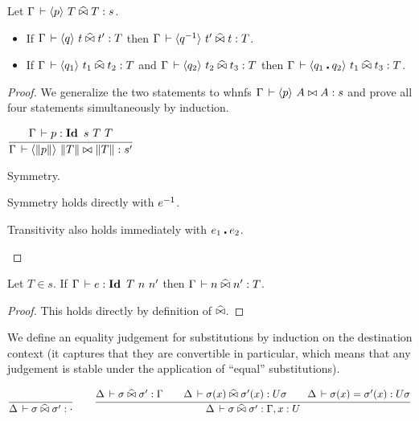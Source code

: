 \documentclass[a4paper,english]{lipics-utf8x}
\begin{document}
  \begin{lemma}
    \label{lem:s-per}
    Let $\Gamma \,\vdash \langle p \rangle~ T \mathrel{\widehat{\bowtie}} T : s$.
    \leavevmode
    \begin{itemize}
      \item If $\Gamma \,\vdash \langle q \rangle~ t \mathrel{\widehat{\bowtie}} t' : T$ then
      $\Gamma \,\vdash \langle q^{-1} \rangle~ t' \mathrel{\widehat{\bowtie}} t : T$.
      \item If $\Gamma \,\vdash \langle q_1 \rangle~ t_1 \mathrel{\widehat{\bowtie}} t_2 : T$ and
      $\Gamma \,\vdash \langle q_2 \rangle~ t_2 \mathrel{\widehat{\bowtie}} t_3 : T$
      then $\Gamma \,\vdash \langle q_1 \centerdot q_2 \rangle~ t_1 \mathrel{\widehat{\bowtie}} t_3 : T$.
    \end{itemize}
  \end{lemma}

  \begin{proof}
    We generalize the two statements to whnfs
    $\Gamma \,\vdash \langle p \rangle~ A \mathrel{\bowtie} A : s$ and
    prove all four statements simultaneously by induction.

    \begin{center}
    \(
      \ru{\Gamma \der p : \Id s\ T\ T
        }{\Gamma \der \hideq{\squash{p}} \squash{T} \Er \squash{T} : s'}
    \)
    \end{center}

    \begin{caselist}
      \nextcase Symmetry.
      \begin{mathc}
      \end{mathc}
      Symmetry holds directly with $e^{-1}$.

      \nextcase Transitivity also holds immediately with $e_1 \centerdot e_2$.
    \end{caselist}
  \end{proof}

  \begin{lemma}
    Let $T \in s$.
    If $\Gamma \,\vdash e : \operatorname{\mathbf{Id}~} T\ n\ n'$ then $\Gamma \,\vdash n \mathrel{\widehat{\bowtie}} n' : T$.
  \end{lemma}

  \begin{proof}
    This holds directly by definition of $\mathrel{\widehat{\bowtie}}$.
  \end{proof}


  We define an equality judgement for substitutions by induction on the
  destination context (it captures that they are convertible in particular,
  which means that any judgement is stable under the application of
  ``equal'' substitutions).
  \begin{center}
  \(
    \ru{}{\Delta \der \sigma \hEr \sigma' : \cdot}
    \qquad
    \ru{\Delta \der \sigma \hEr \sigma' : \Gamma \qquad
        \Delta \der \sigma(x) \hEr \sigma'(x) : U \sigma \qquad
        \Delta \der \sigma(x) = \sigma'(x) : U \sigma
      }{\Delta \der \sigma \hEr \sigma' : \Gamma, x:U}
  \)
  \end{center}
\end{document}
